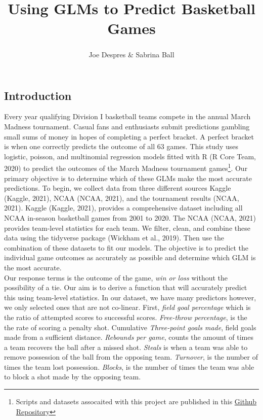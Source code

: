 \documentclass[
  english,
  man,floatsintext]{apa6}
\title{Using GLMs to Predict Basketball Games}
\author{Joe Despres\textsuperscript{} \& Sabrina Ball\textsuperscript{}}
\date{}
\affiliation{\vspace{0.5cm}\textsuperscript{} Michigan State University}
\begin{document}
\maketitle

\hypertarget{introduction}{%
\subsection{Introduction}\label{introduction}}

Every year qualifying Division I basketball teams compete in the annual March Madness tournament. Casual fans and enthusiasts submit predictions gambling small sums of money in hopes of completing a perfect bracket. A perfect bracket is when one correctly predicts the outcome of all 63 games. This study uses logistic, poisson, and multinomial regression models fitted with R (R Core Team, 2020) to predict the outcomes of the March Madness tournament games\footnote{Scripts and datasets assocaited with this project are published in this \href{https://github.com/despresj/March-Madness}{Github Repository}}. Our primary objective is to determine which of these GLMs make the most accurate predictions. To begin, we collect data from three different sources Kaggle (Kaggle, 2021), NCAA (NCAA, 2021), and the tournament results (NCAA, 2021). Kaggle (Kaggle, 2021), provides a comprehensive dataset including all NCAA in-season basketball games from 2001 to 2020. The NCAA (NCAA, 2021) provides team-level statistics for each team. We filter, clean, and combine these data using the tidyverse package (Wickham et al., 2019). Then use the combination of these datasets to fit our models. The objective is to predict the individual game outcomes as accurately as possible and determine which GLM is the most accurate.\\
Our response terms is the outcome of the game, \emph{win or loss} without the possibility of a tie. Our aim is to derive a function that will accurately predict this using team-level statistics. In our dataset, we have many predictors however, we only selected ones that are not co-linear. First, \emph{field goal percentage} which is the ratio of attempted scores to successful scores. \emph{Free-throw percentage}, is the the rate of scoring a penalty shot. Cumulative \emph{Three-point goals made}, field goals made from a sufficient distance. \emph{Rebounds per game}, counts the amount of times a team recovers the ball after a missed shot. \emph{Steals} is when a team was able to remove possession of the ball from the opposing team. \emph{Turnover}, is the number of times the team lost possession. \emph{Blocks}, is the number of times the team was able to block a shot made by the opposing team.\\
\end{document}
